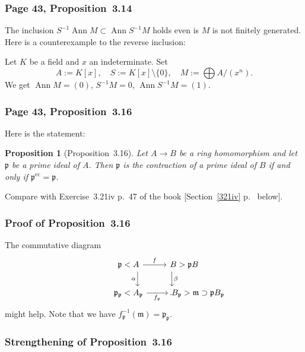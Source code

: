 \documentclass[12pt,letterpaper]{article}%
\newcommand{\oo}{\operatorname}\newcommand{\ooo}{\operatorname*}
\newcommand{\mf}{\mathfrak}
\newcommand{\mmm}{\mf m}
\newcommand{\ppp}{\mf p}
\newtheorem{prop}[thm]{Proposition}
\begin{document}

\subsubsection{Page 43, Proposition~3.14}%

The inclusion $S^{-1}\oo{Ann}M\subset\oo{Ann}S^{-1}M$ holds even is $M$ is not finitely generated. Here is a counterexample to the reverse inclusion:

Let $K$ be a field and $x$ an indeterminate. Set 
$$
A:=K[x],\quad S:=K[x]\setminus\{0\},\quad M:=\bigoplus A/(x^n).
$$ 
We get $\oo{Ann}M=(0)$, $S^{-1}M=0$, $\oo{Ann}S^{-1}M=(1)$. 

\subsubsection{Page 43, Proposition~3.16}%

Here is the statement: 
%
\begin{prop}[Proposition~3.16]\label{p3.16}
Let $A\to B$ be a ring homomorphism and let $\ppp$ be a prime ideal of $A$. Then $\ppp$  is the contraction of a prime ideal of $B$ if and only if $\ppp^{\mathrm{ec}}=\ppp$.
\end{prop}

Compare with Exercise~3.21iv p.~47 of the book [Section~\ref{321iv} p.~\pageref{321iv} below].

\subsubsection{Proof of Proposition~3.16}

The commutative diagram
$$
\begin{tikzcd}
\kern-22pt\ppp<A\ar[d,"\alpha"']\ar[r,"f"]&B>\ppp B\ar[d,"\beta"]\kern-30pt\\ 
\kern-22pt\ppp_\ppp<A_\ppp\ar[r,"f_\ppp"']&B_\ppp>\mmm\supset\ppp B_\ppp\kern-66pt.
\end{tikzcd}
$$ 
might help. Note that we have $f_\ppp^{-1}(\mmm)=\ppp_\ppp$.


\subsubsection{Strengthening of Proposition~3.16}\label{43}
\end{document}
